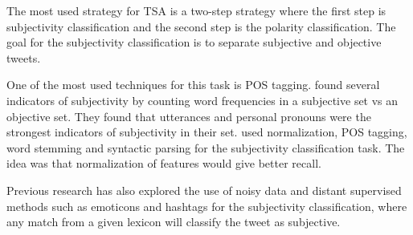 The most used strategy for TSA is a two-step strategy where the first step is subjectivity classification and the second step is the polarity classification. The goal for the subjectivity classification is to separate subjective and objective tweets.

One of the most used techniques for this task is POS tagging. \cite{article:pak} found several indicators of subjectivity by counting word frequencies in a subjective set vs an objective set. They found that utterances and personal pronouns were the strongest indicators of subjectivity in their set. \cite{article:jiang} used normalization, POS tagging, word stemming and syntactic parsing for the subjectivity classification task. The idea was that normalization of features would give better recall.

Previous research has also explored the use of noisy data and distant supervised methods such as emoticons and hashtags for the subjectivity classification, where any match from a given lexicon will classify the tweet as subjective.
